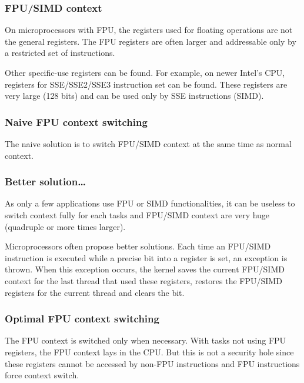 
\begin{frame}
  \frametitle{FPU/SIMD context}

  On microprocessors with FPU, the registers used for floating
  operations are not the general registers. The FPU registers are
  often larger and addressable only by a restricted set of
  instructions.

  \-

  Other specific-use registers can be found. For example, on newer
  Intel's CPU, registers for SSE/SSE2/SSE3 instruction set can be
  found. These registers are very large (128 bits) and can be used
  only by SSE instructions (SIMD).

\end{frame}


\begin{frame}
  \frametitle{Naive FPU context switching}

  The naive solution is to switch FPU/SIMD context at the same time as
  normal context.

  \begin{center}
  \end{center}

\end{frame}


\begin{frame}
  \frametitle{Better solution\ldots}

  As only a few applications use FPU or SIMD functionalities, it can
  be useless to switch context fully for each tasks and FPU/SIMD
  context are very huge (quadruple or more times larger).

  \-

  Microprocessors often propose better solutions. Each time an
  FPU/SIMD instruction is executed while a precise bit into a register
  is set, an exception is thrown. When this exception occurs, the
  kernel saves the current FPU/SIMD context for the last thread that
  used these registers, restores the FPU/SIMD registers for the
  current thread and clears the bit.

\end{frame}


\begin{frame}
  \frametitle{Optimal FPU context switching}

  \begin{center}
  \end{center}

  The FPU context is switched only when necessary. With tasks not
  using FPU registers, the FPU context lays in the CPU. But this is
  not a security hole since these registers cannot be accessed by
  non-FPU instructions and FPU instructions force context switch.

\end{frame}

